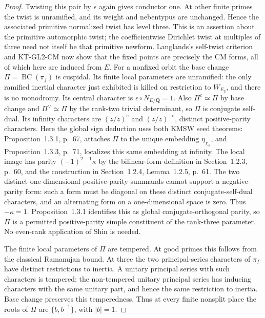 \documentclass[11pt,a4paper]{article}
\theoremstyle{definition}
\begin{document}
\begin{proof}
Twisting this pair by $\epsilon$ again gives conductor one.
At other finite primes the twist is unramified, and its weight
and nebentypus are unchanged. Hence the associated primitive
normalized twist has level three. This is an assertion about
the primitive automorphic twist; the coefficientwise Dirichlet
twist at multiples of three need not itself be that primitive
newform.
Langlands's self-twist criterion and KT-GL2-CM now show that
the fixed points are precisely the CM forms, all of which here
are induced from $E$.
For a nonfixed orbit the base change $\Pi=\operatorname{BC}(\pi_f)$
is cuspidal. Its finite local parameters are unramified:
the only ramified inertial character just exhibited is killed
on restriction to $W_{E_3}$, and there is no monodromy.
Its central character is $\epsilon\circ N_{E/\mathbf Q}=1$.
Also $\Pi^c\simeq\Pi$ by base change and
$\Pi^\vee\simeq\Pi$ by the rank-two trivial determinant,
so $\Pi$ is conjugate self-dual.
Its infinity characters are $(z/\bar z)^e$ and $(z/\bar z)^{-e}$,
distinct positive-parity characters. Here the global sign deduction
uses both KMSW seed theorems: Proposition~1.3.1, p.~67,
attaches $\Pi$ to the unique embedding $\eta_{\chi_\kappa}$,
and Proposition~1.3.3, p.~71, localizes this same embedding
at infinity. The local image has parity $(-1)^{2-1}\kappa$
by the bilinear-form definition in Section~1.2.3, p.~60,
and the construction in Section~1.2.4, Lemma~1.2.5, p.~61.
The two distinct one-dimensional positive-parity summands
cannot support a negative-parity form: such a form must be
diagonal on these distinct conjugate-self-dual characters, and
an alternating form on a one-dimensional space is zero.
Thus $-\kappa=1$. Proposition~1.3.1 identifies this as
global conjugate-orthogonal parity, so $\Pi$ is a permitted
positive-parity simple constituent of the rank-three parameter.
No even-rank application of Shin is needed.

The finite local parameters of $\Pi$ are tempered. At good
primes this follows from the classical Ramanujan bound.
At three the two principal-series characters of $\pi_f$ have
distinct restrictions to inertia. A unitary principal series
with such characters is tempered: the non-tempered unitary
principal series has inducing characters with the same unitary
part, and hence the same restriction to inertia. Base change
preserves this temperedness. Thus at every finite nonsplit
place the roots of $\Pi$ are $\{b,b^{-1}\}$, with $|b|=1$.


\end{proof}
\end{document}
